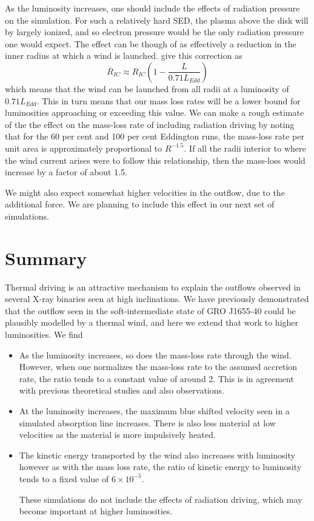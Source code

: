 \documentclass[a4paper,fleqn,usenatbib]{mnras}
\begin{document}
As the luminosity increases, one should include the effects
of radiation pressure on the simulation. For such a relatively hard SED, 
the plasma above the disk will by largely ionized, and so electron
pressure would be the only radiation pressure one would expect. The 
effect can be though of as effectively a reduction in the inner radius
at which a wind is launched. \cite{2018MNRAS.473..838D} give this 
correction as
\begin{equation}
\overline{R}_{IC}\approx R_{IC}\left(1-\frac{L}{0.71L_{Edd}}\right)
\end{equation}
which means that the wind can be launched from all radii at a luminosity
of $0.71 L_{Edd}$. This in turn means that our mass loss rates will be a lower 
bound for luminosities approaching or exceeding this value. We can make a rough
estimate of the the effect on the mass-loss rate of including radiation driving by
noting that for the 60 per cent and 100 per cent Eddington runs, the mass-loss
rate per unit area is approximately proportional to $R^{-1.5}$. If all the radii
interior to where the wind current arises were to follow this relationship, then the 
mass-loss would increase by a factor of about 1.5. 

We might also 
expect somewhat higher velocities in the outflow, due to the additional force. 
We are planning to include this effect in our next set of simulations.


\section{Summary }

Thermal driving is an attractive mechanism to explain the outflows observed in several 
X-ray binaries seen at high inclinations. We have previously demonstrated that 
the outflow seen in the soft-intermediate state of GRO J1655-40 could be plausibly 
modelled by a thermal wind, and here we extend that work to higher luminosities. We find

\begin{itemize}
\item{As the luminosity increases, so does the mass-loss rate through the wind. However, 
when one normalizes the mass-loss rate to the assumed accretion rate, the ratio tends to 
a constant value of around 2. This is in agreement with previous theoretical studies and 
also observations.}
\item{At the luminosity increases, the maximum blue shifted velocity seen in a simulated 
absorption line increases. There is also less material at low velocities as the material 
is more impulsively heated.}
\item{The kinetic energy transported by the wind also increases with luminosity however 
as with the mass loss rate, the ratio of kinetic energy to luminosity tends to a fixed value
of $6\times10^{-5}$.}

These simulations do not include the effects of radiation driving, which may become
important at higher luminosities. 



\end{itemize}
\end{document}
